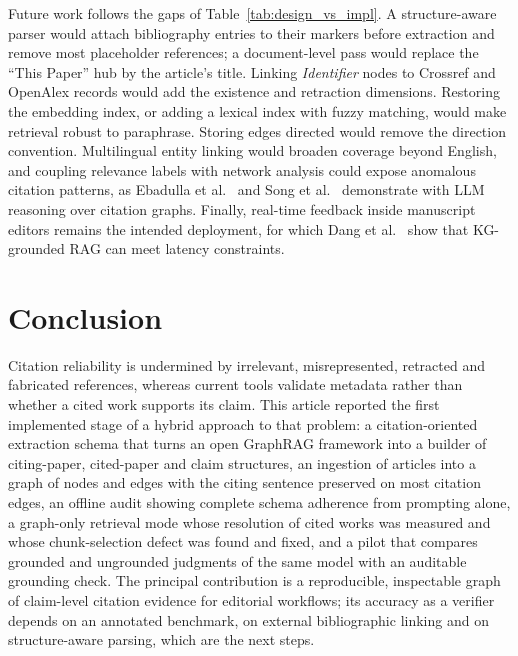 \documentclass[lettersize,journal]{IEEEtran}
\begin{document}
Future work follows the gaps of Table~\ref{tab:design_vs_impl}. A structure-aware parser would attach bibliography entries to their markers before extraction and remove most placeholder references; a document-level pass would replace the ``This Paper'' hub by the article's title. Linking \emph{Identifier} nodes to Crossref and OpenAlex records would add the existence and retraction dimensions. Restoring the embedding index, or adding a lexical index with fuzzy matching, would make retrieval robust to paraphrase. Storing edges directed would remove the direction convention. Multilingual entity linking would broaden coverage beyond English, and coupling relevance labels with network analysis could expose anomalous citation patterns, as Ebadulla et al.~\cite{ebadulla2025detecting} and Song et al.~\cite{song2027thinking} demonstrate with LLM reasoning over citation graphs. Finally, real-time feedback inside manuscript editors remains the intended deployment, for which Dang et al.~\cite{dang2026intelligent} show that KG-grounded RAG can meet latency constraints.

\section{Conclusion}
\label{sec:conclusion}

Citation reliability is undermined by irrelevant, misrepresented, retracted and fabricated references, whereas current tools validate metadata rather than whether a cited work supports its claim. This article reported the first implemented stage of a hybrid approach to that problem: a citation-oriented extraction schema that turns an open GraphRAG framework into a builder of citing-paper, cited-paper and claim structures, an ingestion of \nDocsProcessed{} articles into a graph of \nNodes{} nodes and \nEdges{} edges with the citing sentence preserved on most citation edges, an offline audit showing complete schema adherence from prompting alone, a graph-only retrieval mode whose resolution of cited works was measured and whose chunk-selection defect was found and fixed, and a pilot that compares grounded and ungrounded judgments of the same model with an auditable grounding check. The principal contribution is a reproducible, inspectable graph of claim-level citation evidence for editorial workflows; its accuracy as a verifier depends on an annotated benchmark, on external bibliographic linking and on structure-aware parsing, which are the next steps.

\balance


\end{document}
